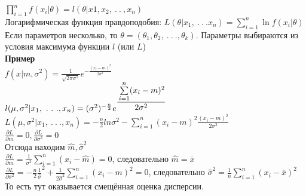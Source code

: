\documentclass[russian, 12pt, fleqn,x11names]{article}
\begin{document}
$\displaystyle{\prod_{i = 1} ^ n} f(x_i|\theta) = l(\theta|x1,x_2,\ .\ .\ ,x_n)$\\
Логарифмическая функция правдоподобия: $L(\theta|x_1,\ .\ .\ . x_n) = \displaystyle{\sum \limits_{i = 1} ^ {n}} \ln f(x_i|\theta)$\\
Если параметров несколько, то $\theta = (\theta_1, \theta_2, \ .\ .\ . ,\theta_k)$. Параметры выбираются из условия максимума функции $l$ (или $L$)\\
\textbf{Пример}\\ 
$f(x|m, \sigma^2) = \frac{1}{\sqrt{2\pi\sigma^2}} e^{-\frac{(x_i - m)^2}{2\sigma^2}}$\\
$l(\mu, \sigma^2|x_1, \ .\ .\ ., x_n) = (\sigma^2)^{-\frac{n}{2}}e^{\displaystyle{\cfrac{\sum \limits_{i = 1}^{n}(x_i - m)^2}{2\sigma^2}} }$\\
$L(\mu, \sigma^2|x_1, \ .\ .\ ., x_n) = - \frac{n}{2} ln \sigma^2 - \displaystyle{\sum \limits_{i = 1}^{n}}(x_i - m)^2\frac{(x_i - m)^2}{2\sigma^2}$\\
$\frac{\partial L}{\partial m} = 0, \frac{\partial L}{\partial \sigma^2} = 0$\\
Отсюда находим $\hat{m}, \hat{\sigma}^2$\\
$\frac{\partial L}{\partial m} = \frac{1}{\sigma^2} \displaystyle{\sum \limits _{i = 1} ^ {n} } (x_i - \hat{m}) = 0$, следовательно $\hat{m} = \overline{x}$\\
$\frac{\partial L}{\partial \sigma^2} = -\frac{n}{2} \frac{1}{\hat{\sigma}}^2 + \frac{1}{2\hat{\sigma}^2}  \displaystyle{\sum \limits _{i = 1} ^ {n} } (x_i - m)^2 = 0$, следовательно 
$\hat{\sigma}^2 = \frac{1}{n}  \displaystyle{\sum \limits _{i = 1} ^ {n} } (x_i - \overline{x})^2$\\
То есть тут оказывается смещённая оценка дисперсии.
\end{document}
